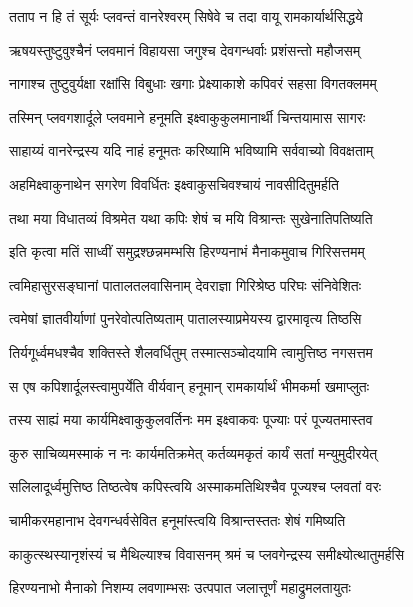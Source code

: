 \twolineshloka
{तताप न हि तं सूर्यः प्लवन्तं वानरेश्वरम्}
{सिषेवे च तदा वायू रामकार्यार्थसिद्धये} %

\twolineshloka
{ऋषयस्तुष्टुवुश्चैनं प्लवमानं विहायसा}
{जगुश्च देवगन्धर्वाः प्रशंसन्तो महौजसम्} %

\twolineshloka
{नागाश्च तुष्टुवुर्यक्षा रक्षांसि विबुधाः खगाः}
{प्रेक्ष्याकाशे कपिवरं सहसा विगतक्लमम्} %

\twolineshloka
{तस्मिन् प्लवगशार्दूले प्लवमाने हनूमति}
{इक्ष्वाकुकुलमानार्थी चिन्तयामास सागरः} %

\twolineshloka
{साहाय्यं वानरेन्द्रस्य यदि नाहं हनूमतः}
{करिष्यामि भविष्यामि सर्ववाच्यो विवक्षताम्} %

\twolineshloka
{अहमिक्ष्वाकुनाथेन सगरेण विवर्धितः}
{इक्ष्वाकुसचिवश्चायं नावसीदितुमर्हति} %

\twolineshloka
{तथा मया विधातव्यं विश्रमेत यथा कपिः}
{शेषं च मयि विश्रान्तः सुखेनातिपतिष्यति} %

\twolineshloka
{इति कृत्वा मतिं साध्वीं समुद्रश्छन्नमम्भसि}
{हिरण्यनाभं मैनाकमुवाच गिरिसत्तमम्} %

\twolineshloka
{त्वमिहासुरसङ्घानां पातालतलवासिनाम्}
{देवराज्ञा गिरिश्रेष्ठ परिघः संनिवेशितः} %

\twolineshloka
{त्वमेषां ज्ञातवीर्याणां पुनरेवोत्पतिष्यताम्}
{पातालस्याप्रमेयस्य द्वारमावृत्य तिष्ठसि} %

\twolineshloka
{तिर्यगूर्ध्वमधश्चैव शक्तिस्ते शैलवर्धितुम्}
{तस्मात्सञ्चोदयामि त्वामुत्तिष्ठ नगसत्तम} %

\twolineshloka
{स एष कपिशार्दूलस्त्वामुपर्येति वीर्यवान्}
{हनूमान् रामकार्यार्थं भीमकर्मा खमाप्लुतः} %

\twolineshloka
{तस्य साह्यं मया कार्यमिक्ष्वाकुकुलवर्तिनः}
{मम इक्ष्वाकवः पूज्याः परं पूज्यतमास्तव} %

\twolineshloka
{कुरु साचिव्यमस्माकं न नः कार्यमतिक्रमेत्}
{कर्तव्यमकृतं कार्यं सतां मन्युमुदीरयेत्} %

\twolineshloka
{सलिलादूर्ध्वमुत्तिष्ठ तिष्ठत्वेष कपिस्त्वयि}
{अस्माकमतिथिश्चैव पूज्यश्च प्लवतां वरः} %

\twolineshloka
{चामीकरमहानाभ देवगन्धर्वसेवित}
{हनूमांस्त्वयि विश्रान्तस्ततः शेषं गमिष्यति} %

\twolineshloka
{काकुत्स्थस्यानृशंस्यं च मैथिल्याश्च विवासनम्}
{श्रमं च प्लवगेन्द्रस्य समीक्ष्योत्थातुमर्हसि} %

\twolineshloka
{हिरण्यनाभो मैनाको निशम्य लवणाम्भसः}
{उत्पपात जलात्तूर्णं महाद्रुमलतायुतः} %

